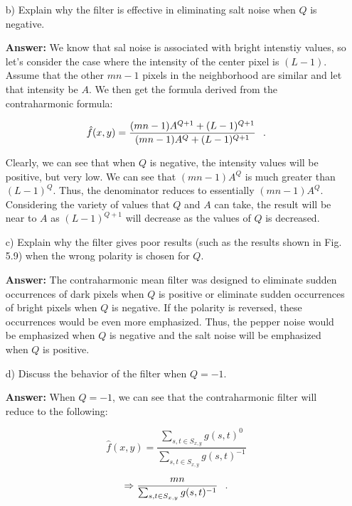 \documentclass{article}
\begin{document}
\begin{enumerate}
\begin{enumerate}
\item[b)] Explain why the filter is effective in eliminating salt noise when $Q$ is negative.

\textbf{Answer: }We know that sal noise is associated with bright intenstiy values, so let's consider the case where the intensity of the center pixel is $(L-1)$. Assume that the other $mn - 1$ pixels
in the neighborhood are similar and let that intensity be $A$. We then get the formula derived from the contraharmonic formula:

$$\hat f (x,y) = \frac{(mn - 1) A^{Q+1} + (L-1)^{Q+1}}{(mn - 1) A^Q + (L-1)^{Q+1}} \hspace{0.1in} .$$

Clearly, we can see that when $Q$ is negative, the intensity values will be positive, but very low.  We can see that $(mn - 1)A^Q$ is much greater than $(L-1)^Q$.  Thus, the denominator reduces
to essentially $(mn-1)A^Q$.  Considering the variety of values that $Q$ and $A$ can take, the result will be near to $A$ as $(L-1)^{Q+1}$ will decrease as the values of $Q$ is decreased.

\item[c)] Explain why the filter gives poor results (such as the results shown in Fig. 5.9) when the wrong polarity is chosen for $Q$.

\textbf{Answer: }The contraharmonic mean filter was designed to eliminate sudden occurrences of dark pixels when $Q$ is positive or eliminate sudden occurrences of bright pixels when $Q$ is negative.
If the polarity is reversed, these occurrences would be even more emphasized.  Thus, the pepper noise would be emphasized when $Q$ is negative and the salt noise will be emphasized when $Q$ is positive.

\item[d)] Discuss the behavior of the filter when $Q=-1$.

\textbf{Answer: }When $Q = -1$, we can see that the contraharmonic filter will reduce to the following:

\begin{equation}
\hat f (x,y) = \frac{\sum_{s,t \in S_{x,y}}^{} g(s,t)^0}{\sum_{s,t \in S_{x,y}}^{} g(s,t)^{-1}}
\end{equation}

\begin{equation}
\Rightarrow \frac{mn}{\sum_{s,t \in S_{x,y}}^{} g(s,t)^{-1}} \hspace{0.1in} .
\end{equation}


\end{enumerate}
\end{enumerate}
\end{document}
